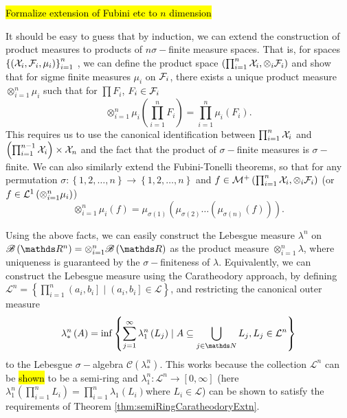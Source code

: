 \hl{Formalize extension of Fubini etc to $n$ dimension}

It should be easy to guess that by induction, we can extend the construction
of product measures to products of $n$$\sigma-$finite measure spaces.
That is, for spaces $\left\{ \left(\mathcal{X}_{i},\mathcal{F}_{i},\mu_{i}\right)\right\} _{i=1}^{n}$
, we can define the product space $\left(\prod_{i=1}^{n}\mathcal{X}_{i},\otimes_{i}\mathcal{F}_{i}\right)$
and show that for sigme finite measures $\mu_{i}$ on $\mathcal{F}_{i}$, there
exists a unique product measure $\otimes_{i=1}^{n}\mu_{i}$ such that
for $\prod F_{i}$, $F_{i}\in\mathcal{F}_{i}$
\[
\otimes_{i=1}^{n}\mu_{i}\left(\prod_{i=1}^{n}F_{i}\right)=\prod_{i=1}^{n}\mu_{i}\left(F_{i}\right).
\]
This requires us to use the canonical identification between $\prod_{i=1}^{n}\mathcal{X}_{i}$
and $\left(\prod_{i=1}^{n-1}\mathcal{X}_{i}\right)\times\mathcal{X}_{n}$ and the fact
that the product of $\sigma-$finite measures is $\sigma-$finite.
We can also similarly extend the Fubini-Tonelli theorems, so that
for any permutation $\sigma:\left\{ 1,2,\dots,n\right\} \to\left\{ 1,2,\ldots,n\right\} $
and $f\in\mathcal{M}^{+}\left(\prod_{i=1}^{n}\mathcal{X}_{i},\otimes_{i}\mathcal{F}_{i}\right)$
(or $f\in\mathcal{L}^{1}\left(\otimes_{i=1}^{n}\mu_{i}\right)$)
\[
\otimes_{i=1}^{n}\mu_{i}\left(f\right)=\mu_{\sigma\left(1\right)}\left(\mu_{\sigma\left(2\right)}\ldots\left(\mu_{\sigma\left(n\right)}\left(f\right)\right)\right).
\]

Using the above facts, we can easily construct the Lebesgue measure
$\lambda^{n}$ on $\borel\left(\R^{n}\right)=\otimes_{i=1}^{n}\borel\left(\R\right)$
as the product measure $\otimes_{i=1}^{n}\lambda$, where uniqueness
is guaranteed by the $\sigma-$finiteness of $\lambda$. Equivalently,
we can construct the Lebesgue measure using the Caratheodory approach,
by defining $\mathcal{L}^{n}=\left\{ \prod_{i=1}^{n}\left(a_{i},b_{i}\right]\mid\left(a_{i},b_{i}\right]\in\mathcal{L}\right\} $,
and restricting the canonical outer measure
\[
\lambda_{*}^{n}\left(A\right)=\inf\left\{ \sum_{j=1}^{\infty}\lambda_{1}^{n}\left(L_{j}\right)\mid A\subseteq\bigcup_{j\in\N}L_{j},L_{j}\in\mathcal{L}^{n}\right\} 
\]
to the Lebesgue $\sigma-$algebra $\mathcal{C}\left(\lambda_{*}^{n}\right)$.
This works because the collection $\mathcal{L}^{n}$ can be \hl{shown}
to be a semi-ring and $\lambda_{1}^{n}:\mathcal{L}^{n}\to\left[0,\infty\right]$
(here $\lambda_{1}^{n}\left(\prod_{i=1}^{n}L_{i}\right)=\prod_{i=1}^{n}\lambda_{1}\left(L_{i}\right)$where
$L_{i}\in\mathcal{L}$) can be shown to satisfy the requirements of
Theorem \ref{thm:semiRingCaratheodoryExtn}.


